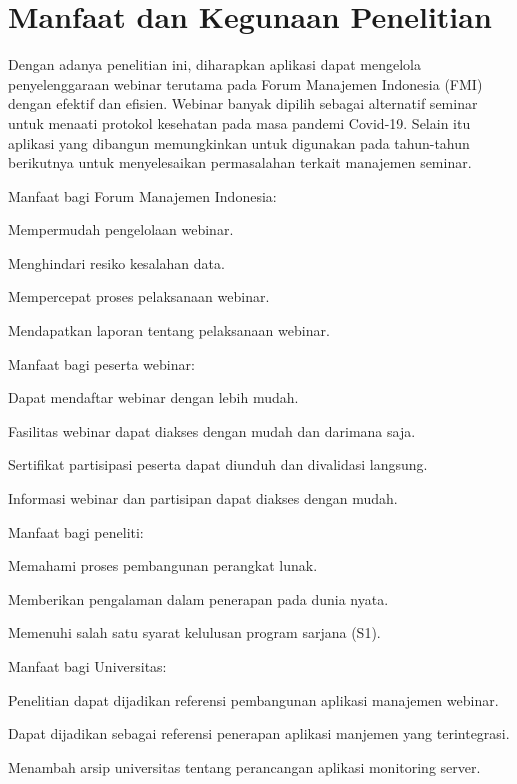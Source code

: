 \section{Manfaat dan Kegunaan Penelitian}

Dengan adanya penelitian ini, diharapkan aplikasi dapat mengelola penyelenggaraan webinar terutama pada Forum Manajemen Indonesia (FMI) dengan efektif dan efisien. Webinar banyak dipilih sebagai alternatif seminar untuk menaati protokol kesehatan pada masa pandemi Covid-19. Selain itu aplikasi yang dibangun memungkinkan untuk digunakan pada tahun-tahun berikutnya untuk menyelesaikan permasalahan terkait manajemen seminar.

\begin{ol}
  \item Manfaat bagi Forum Manajemen Indonesia:
    \begin{ol}
      \item Mempermudah pengelolaan webinar.
      \item Menghindari resiko kesalahan data.
      \item Mempercepat proses pelaksanaan webinar.
      \item Mendapatkan laporan tentang pelaksanaan webinar.
    \end{ol}
  \item Manfaat bagi peserta webinar:
    \begin{ol}
      \item Dapat mendaftar webinar dengan lebih mudah.
      \item Fasilitas webinar dapat diakses dengan mudah dan darimana saja.
      \item Sertifikat partisipasi peserta dapat diunduh dan divalidasi langsung.
      \item Informasi webinar dan partisipan dapat diakses dengan mudah.
    \end{ol}
  \item Manfaat bagi peneliti:
    \begin{ol}
      \item Memahami proses pembangunan perangkat lunak.
      \item Memberikan pengalaman dalam penerapan pada dunia nyata.
      \item Memenuhi salah satu syarat kelulusan program sarjana (S1).
    \end{ol}
  \item Manfaat bagi Universitas:
    \begin{ol}
      \item Penelitian dapat dijadikan referensi pembangunan aplikasi manajemen webinar.
      \item Dapat dijadikan sebagai referensi penerapan aplikasi manjemen yang terintegrasi.
      \item Menambah arsip universitas tentang perancangan aplikasi monitoring server.
    \end{ol}
\end{ol}

